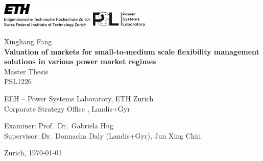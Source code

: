 \begin{titlepage}
\begin{center}

\includegraphics[height=12mm]{Figures/eth_logo_lang_pos}
\hfill
\includegraphics[height=8mm]{Figures/PSL_logo}

\vspace{30mm} Xingliang Fang \\
\vspace{10mm} \textbf{\LARGE Valuation of markets for small-to-medium scale flexibility management solutions in various power market regimes} \\
\vspace{10mm} Master Thesis \\ PSL1226


\vfill

EEH -- Power Systems Laboratory, ETH Zurich \\
Corporate Strategy Office , Landis+Gyr

\vspace{5mm}

Examiner: Prof.~Dr.~Gabriela Hug \\
Supervisor: Dr.~Donnacha Daly (Landis+Gyr), Jun Xing Chin


\vspace{5mm} Zurich, \today

\end{center}
\end{titlepage}
